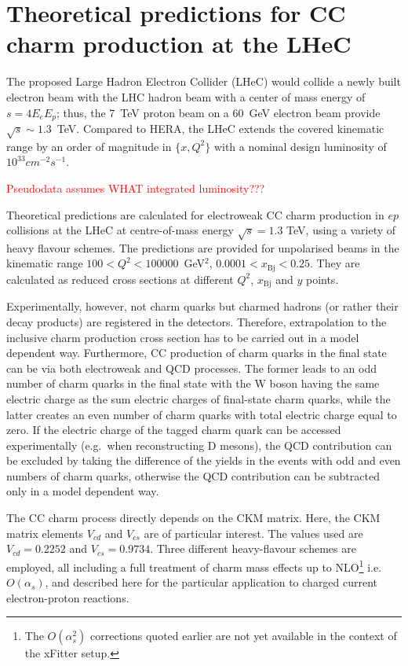 \documentclass[pdftex,twocolumn,epjc3]{svjour3}          %
\newcommand{\xbj}{\ensuremath{x_{\text{Bj}}}\xspace}
\begin{document}
\section{Theoretical predictions for CC charm production at the LHeC} \label{sec:thpred}


The proposed Large Hadron Electron Collider (LHeC) would collide a newly built electron beam
with the LHC hadron beam with a center of mass energy of  $s = 4 E_e E_p$;
thus, the 7~TeV proton beam on a 60~GeV electron beam  provide $\sqrt{s}\sim 1.3$~TeV.
%
Compared to  HERA, the LHeC extends the covered kinematic range by an order of magnitude in $\{x,Q^2 \}$
with a nominal design luminosity of $10^{33} cm^{-2} s^{-1}$.

\textcolor{red}{Pseudodata assumes WHAT integrated luminosity???}

Theoretical predictions are calculated for electroweak CC charm
production in $ep$ collisions at the LHeC at centre-of-mass energy
$\sqrt{s} = 1.3$ TeV, using a variety of heavy flavour schemes. The
predictions are provided for unpolarised beams in the kinematic range
$100 < Q^2 < 100000$~GeV$^2$, $0.0001 < \xbj < 0.25$. They are
calculated as reduced cross sections at different $Q^2$, \xbj and $y$
points.


Experimentally, however, not charm quarks but charmed
hadrons (or rather their decay products) are registered in the
detectors.  Therefore, extrapolation to the inclusive charm
production cross section has to be carried out in a model dependent
way.  Furthermore, CC production of charm quarks in the final state
can be via both electroweak and QCD processes.  The former leads to
an odd number of charm quarks in the final state with the W boson
having the same electric charge as the sum electric charges of
final-state charm quarks, while the latter creates an even number of
charm quarks with total electric charge equal to zero.  If the
electric charge of the tagged charm quark can be accessed
experimentally (e.g.~when reconstructing D mesons), the QCD
contribution can be excluded by taking the difference of the yields
in the events with odd and even numbers of charm quarks, otherwise
the QCD contribution can be subtracted only in a model dependent
way.  

The CC charm process directly depends on the CKM matrix. Here, the CKM matrix 
elements $V_{cd}$ and $V_{cs}$ are of particular interest. The values used are 
$V_{cd} = 0.2252$ and $V_{cs} = 0.9734$.
Three different heavy-flavour schemes are employed, all including a full 
treatment of charm mass effects up to
NLO\footnote{The $O(\alpha_s^2)$ 
corrections quoted earlier are not yet available in the context of the xFitter 
setup.}\llap{,}
i.e.~$O(\alpha_s)$, and described here for the particular application 
to charged current electron-proton reactions.
\end{document}
